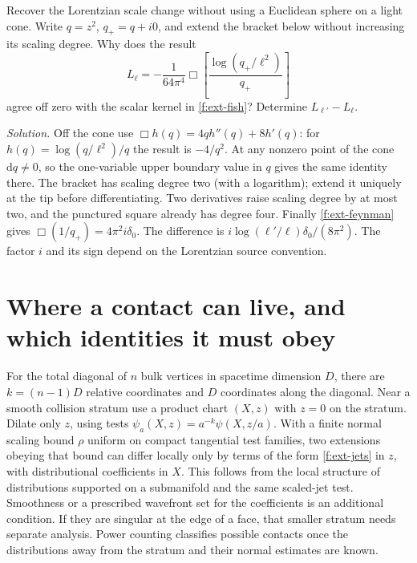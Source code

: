 \begin{exercise}
Recover the Lorentzian scale change without using a Euclidean sphere on a
light cone. Write $q=z^2$, $q_+=q+i0$, and extend the bracket below
without increasing its scaling degree. Why does the result
\[
 L_\ell=-\frac1{64\pi^4}\Box\!\left[\frac{\log(q_+/\ell^2)}{q_+}\right]
\]
agree off zero with the scalar kernel in \eqref{f:ext-fish}? Determine
$L_{\ell'}-L_\ell$.
\end{exercise}
\noindent\emph{Solution.} Off the cone use
$\Box h(q)=4q h''(q)+8h'(q)$: for $h(q)=\log(q/\ell^2)/q$ the result
is $-4/q^2$. At any nonzero point of the cone $\mathrm{d}q\ne0$, so the
one-variable upper boundary value in $q$ gives the same identity there.
The bracket has scaling degree two (with a logarithm); extend it uniquely
at the tip before differentiating. Two derivatives raise scaling degree
by at most two, and the punctured square already has degree four.
Finally \eqref{f:ext-feynman} gives $\Box(1/q_+)=4\pi^2 i\delta_0$.
The difference is $i\log(\ell'/\ell)\delta_0/(8\pi^2)$. The factor $i$
and its sign depend on the Lorentzian source convention.

\section{Where a contact can live, and which identities it must obey}
For the total diagonal of $n$ bulk vertices in spacetime dimension $D$,
there are $k=(n-1)D$ relative coordinates and $D$ coordinates along the
diagonal. Near a smooth collision stratum use a product chart $(X,z)$ with
$z=0$ on the stratum. Dilate only $z$, using tests
$\psi_a(X,z)=a^{-k}\psi(X,z/a)$. With a finite normal scaling bound
$\rho$ uniform on compact tangential test families, two extensions
obeying that bound can differ locally only by terms of the form
\eqref{f:ext-jets} in $z$, with distributional coefficients in $X$.
This follows from the local structure of distributions supported on a
submanifold and the same scaled-jet test. Smoothness or a prescribed
wavefront set for the coefficients is an additional condition. If they are
singular at the edge of a face, that smaller stratum needs separate
analysis. Power counting classifies possible contacts once the distributions
away from the stratum and their normal estimates are known.


